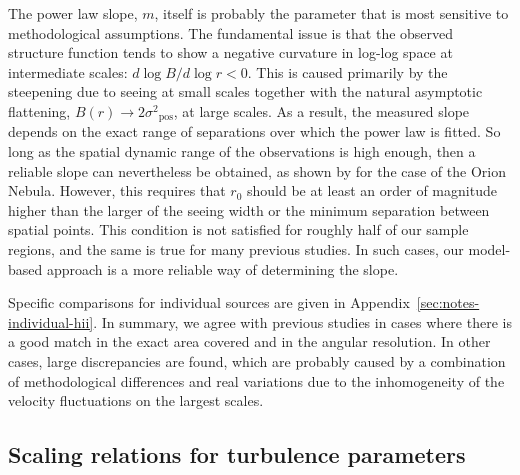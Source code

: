 \documentclass[fleqn,usenatbib, useAMS, a4paper]{mnras}
\newcommand\pos{\ensuremath{_{\mathrm{pos}}}}
\begin{document}
The power law slope, \(m\), itself is probably the parameter that
is most sensitive to methodological assumptions.
The fundamental issue is that the observed structure function tends to
show a negative curvature in log-log space at intermediate scales:
\(d\log B/ d\log r < 0\).
This is caused primarily by the steepening due to seeing at small scales
together with the natural asymptotic flattening, 
\(B(r) \to 2 \sigma^2\pos\), at large scales.
As a result, the measured slope depends on the exact range of
separations over which the power law is fitted.
So long as the spatial dynamic range of the observations is high enough,
then a reliable slope can nevertheless be obtained,
as shown by \citet{arthur2016turbulence} for the case of the Orion Nebula.
However, this requires that \(r_0\) should be at least an order of
magnitude higher than the larger of the seeing width
or the minimum separation between spatial points.
This condition is not satisfied for roughly half of our sample regions,
and the same is true for many previous studies.
In such cases, our model-based approach is a more reliable way of
determining the slope. 

Specific comparisons for individual sources are given
in Appendix~\ref{sec:notes-individual-hii}.
In summary, we agree with previous studies in cases where there
is a good match in the exact area covered and in the angular resolution.
In other cases, large discrepancies are found,
which are probably caused by a combination of methodological differences
and real variations due to the inhomogeneity of the
velocity fluctuations on the largest scales.

\subsection{Scaling relations for turbulence parameters}\label{sec:scaling-relations}
\end{document}
